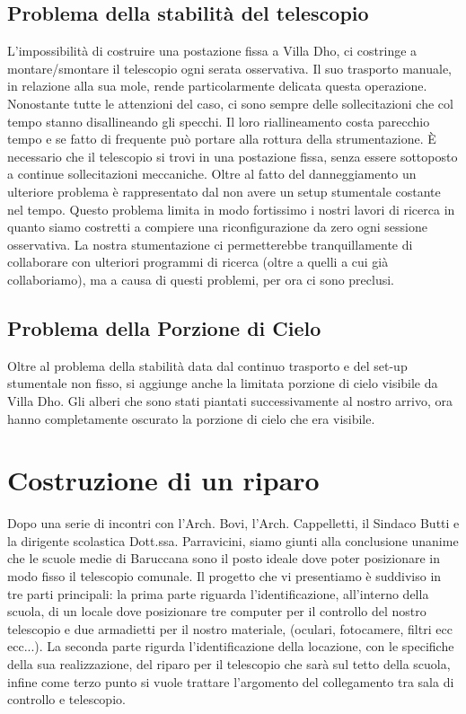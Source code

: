 \documentclass[a4paper,12pt]{article}
\begin{document}
\subsection{Problema della stabilit\`a del telescopio}
L'impossibilit\`a di costruire una postazione fissa a Villa Dho, ci costringe a montare/smontare il telescopio ogni serata osservativa. Il suo trasporto manuale, in relazione alla sua mole, rende particolarmente delicata questa operazione. Nonostante tutte le attenzioni del caso, ci sono sempre delle sollecitazioni che col tempo stanno disallineando gli specchi. Il loro riallineamento costa parecchio tempo e se fatto di frequente pu\`o portare alla rottura della strumentazione.
\`E necessario che il telescopio si trovi in una postazione fissa, senza essere sottoposto a continue sollecitazioni meccaniche.
Oltre al fatto del danneggiamento un ulteriore problema \`e rappresentato dal non avere un setup stumentale costante nel tempo. Questo problema limita in modo fortissimo i nostri lavori di ricerca in quanto siamo costretti a compiere una riconfigurazione da zero ogni sessione osservativa. La nostra stumentazione ci permetterebbe tranquillamente di collaborare con ulteriori programmi di ricerca (oltre a quelli a cui gi\`a collaboriamo), ma a causa di questi problemi, per ora ci sono preclusi.
\subsection{Problema della Porzione di Cielo}
Oltre al problema della stabilit\`a data dal continuo trasporto e del set-up stumentale non fisso, si aggiunge anche la limitata porzione di cielo visibile da Villa Dho. Gli alberi che sono stati piantati successivamente al nostro arrivo, ora hanno completamente oscurato la porzione di cielo che era visibile.

\section{Costruzione di un riparo}
Dopo una serie di incontri con l'Arch. Bovi, l'Arch. Cappelletti, il Sindaco Butti e la dirigente scolastica Dott.ssa. Parravicini, siamo giunti alla conclusione unanime che le scuole medie di Baruccana sono il posto ideale dove poter posizionare in modo fisso il telescopio comunale. Il progetto che vi presentiamo \`e suddiviso in tre parti principali: la prima parte riguarda l'identificazione, all'interno della scuola, di un locale dove posizionare tre computer per il controllo del nostro telescopio e due armadietti per il nostro materiale, (oculari, fotocamere, filtri ecc ecc...). La seconda parte rigurda l'identificazione della locazione, con le specifiche
della sua realizzazione, del riparo per il telescopio che sar\`a sul tetto della scuola, infine come terzo punto si vuole trattare l'argomento del collegamento tra sala di controllo e telescopio.
\end{document}
